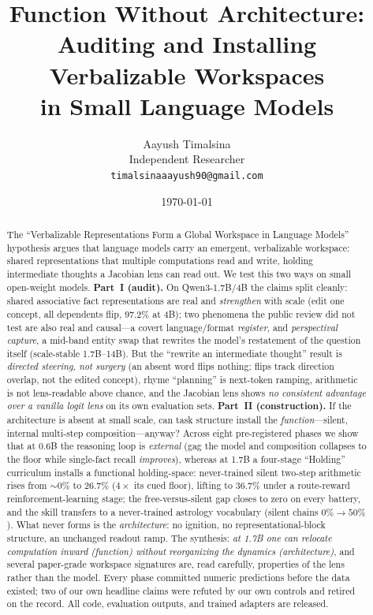 \documentclass[11pt]{article}
\title{\textbf{Function Without Architecture:\\[2pt]
Auditing and Installing Verbalizable Workspaces\\ in Small Language Models}}
\author{Aayush Timalsina\\
Independent Researcher\\
\texttt{timalsinaaayush90@gmail.com}}
\date{\today}
\newcommand{\pct}{\%}
\begin{document}
\maketitle

\begin{abstract}
The ``Verbalizable Representations Form a Global Workspace in Language Models''
hypothesis argues that language models carry an emergent, verbalizable workspace:
shared representations that multiple computations read and write, holding
intermediate thoughts a Jacobian lens can read out. We test this two ways on
small open-weight models. \textbf{Part~I (audit).} On Qwen3-1.7B/4B the claims
split cleanly: shared associative fact representations are real and
\emph{strengthen} with scale (edit one concept, all dependents flip, $97.2\pct$
at 4B); two phenomena the public review did not test are also real and
causal---a covert language/format \emph{register}, and \emph{perspectival
capture}, a mid-band entity swap that rewrites the model's restatement of the
question itself (scale-stable 1.7B--14B). But the ``rewrite an intermediate
thought'' result is \emph{directed steering, not surgery} (an absent word flips
nothing; flips track direction overlap, not the edited concept), rhyme
``planning'' is next-token ramping, arithmetic is not lens-readable above
chance, and the Jacobian lens shows \emph{no consistent advantage over a vanilla
logit lens} on its own evaluation sets. \textbf{Part~II (construction).} If the
architecture is absent at small scale, can task structure install the
\emph{function}---silent, internal multi-step composition---anyway? Across eight
pre-registered phases we show that at 0.6B the reasoning loop is \emph{external}
(gag the model and composition collapses to the floor while single-fact recall
\emph{improves}), whereas at 1.7B a four-stage ``Holding'' curriculum installs a
functional holding-space: never-trained silent two-step arithmetic rises from
$\sim0\pct$ to $26.7\pct$ ($4\times$ its cued floor), lifting to $36.7\pct$ under
a route-reward reinforcement-learning stage; the free-versus-silent gap closes
to zero on every battery, and the skill transfers to a never-trained astrology
vocabulary (silent chains $0\pct{\to}50\pct$). What never forms is the
\emph{architecture}: no ignition, no representational-block structure, an
unchanged readout ramp. The synthesis: \emph{at 1.7B one can relocate computation
inward (function) without reorganizing the dynamics (architecture)}, and several
paper-grade workspace signatures are, read carefully, properties of the lens
rather than the model. Every phase committed numeric predictions before the data
existed; two of our own headline claims were refuted by our own controls and
retired on the record. All code, evaluation outputs, and trained adapters are
released.
\end{abstract}
\end{document}
